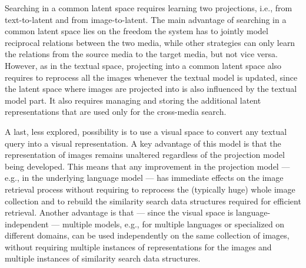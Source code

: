Searching in a common latent space requires learning two projections, i.e., from text-to-latent and from image-to-latent.
The main advantage of searching in a common latent space lies on the freedom the system has to jointly model reciprocal relations between the two media, while other strategies can only learn the relations from the source media to the target media, but not vice versa.
However, as in the textual space, projecting into a common latent space also requires to reprocess all the images whenever the textual model is updated, since the latent space where images are projected into is also influenced by the textual model part.
It also requires managing and storing the additional latent representations that are used only for the cross-media search.

A last, less explored, possibility is to use a visual space to convert any textual query into a visual representation.
A key advantage of this model is that the representation of images remains unaltered regardless of the projection model being developed.
This means that any improvement in the projection model --- e.g., in the underlying language model --- has immediate effects on the image retrieval process without requiring to reprocess the (typically huge) whole image collection and to rebuild the similarity search data structures required for efficient retrieval.
Another advantage is that --- since the visual space is language-independent --- multiple models, e.g., for multiple languages or specialized on different domains, can be used independently on the same collection of images, without requiring multiple instances of representations for the images and multiple instances of similarity search data structures.

